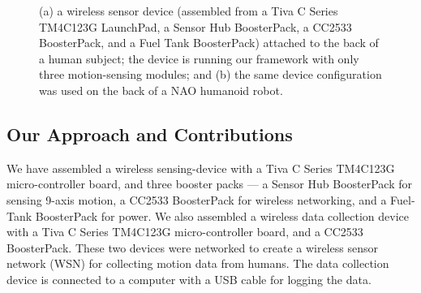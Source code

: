 \documentclass[]{IEEEtran}
\begin{document}
\begin{figure}[!tb]
\centering
{}
\qquad
{} 
\caption{(a) a wireless sensor device (assembled from a Tiva C Series  TM4C123G 
LaunchPad, a Sensor Hub BoosterPack, a CC2533 BoosterPack, and a Fuel Tank BoosterPack) 
attached to the back of a human subject; the device is running our framework  with only 
three motion-sensing modules; and (b) the 
same device configuration was used on the back of a NAO humanoid robot\cite{abeyruwanFlairs2015}.}
 \label{fig:deviceWithSubjects}
\end{figure}

\subsection{Our Approach and Contributions}

 
We have assembled a wireless sensing-device with a Tiva C Series TM4C123G
micro-controller board, and three booster packs --- a Sensor Hub BoosterPack  for
sensing 9-axis motion,  a CC2533  BoosterPack for wireless networking, and a
Fuel-Tank BoosterPack for power. We also assembled a wireless data collection
device with a Tiva C Series TM4C123G micro-controller board, and a  CC2533
BoosterPack. These two devices were networked to create a wireless sensor
network (WSN) for collecting motion data from  humans.  The data collection
device is connected to a computer with a USB cable for logging the data.   
\end{document}
